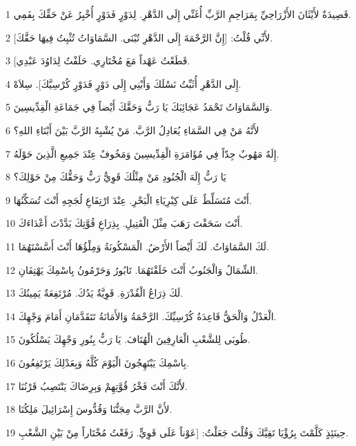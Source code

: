 \par 1 قَصِيدَةٌ لأَيْثَانَ الأَزْرَاحِيِّ بِمَرَاحِمِ الرَّبِّ أُغَنِّي إِلَى الدَّهْرِ. لِدَوْرٍ فَدَوْرٍ أُخْبِرُ عَنْ حَقِّكَ بِفَمِي.
\par 2 لأَنِّي قُلْتُ: [إِنَّ الرَّحْمَةَ إِلَى الدَّهْرِ تُبْنَى. السَّمَاوَاتُ تُثْبِتُ فِيهَا حَقَّكَ].
\par 3 [قَطَعْتُ عَهْداً مَعَ مُخْتَارِي. حَلَفْتُ لِدَاوُدَ عَبْدِي.
\par 4 إِلَى الدَّهْرِ أُثَبِّتُ نَسْلَكَ وَأَبْنِي إِلَى دَوْرٍ فَدَوْرٍ كُرْسِيَّكَ]. سِلاَهْ.
\par 5 وَالسَّمَاوَاتُ تَحْمَدُ عَجَائِبَكَ يَا رَبُّ وَحَقَّكَ أَيْضاً فِي جَمَاعَةِ الْقِدِّيسِينَ.
\par 6 لأَنَّهُ مَنْ فِي السَّمَاءِ يُعَادِلُ الرَّبَّ. مَنْ يُشْبِهُ الرَّبَّ بَيْنَ أَبْنَاءِ اللهِ؟
\par 7 إِلَهٌ مَهُوبٌ جِدّاً فِي مُؤَامَرَةِ الْقِدِّيسِينَ وَمَخُوفٌ عِنْدَ جَمِيعِ الَّذِينَ حَوْلَهُ.
\par 8 يَا رَبُّ إِلَهَ الْجُنُودِ مَنْ مِثْلُكَ قَوِيٌّ رَبٌّ وَحَقُّكَ مِنْ حَوْلِكَ؟
\par 9 أَنْتَ مُتَسَلِّطٌ عَلَى كِبْرِيَاءِ الْبَحْرِ. عِنْدَ ارْتِفَاعِ لُجَجِهِ أَنْتَ تُسَكِّنُهَا.
\par 10 أَنْتَ سَحَقْتَ رَهَبَ مِثْلَ الْقَتِيلِ. بِذِرَاعِ قُوَّتِكَ بَدَّدْتَ أَعْدَاءَكَ.
\par 11 لَكَ السَّمَاوَاتُ. لَكَ أَيْضاً الأَرْضُ. الْمَسْكُونَةُ وَمِلْؤُهَا أَنْتَ أَسَّسْتَهُمَا.
\par 12 الشِّمَالُ وَالْجَنُوبُ أَنْتَ خَلَقْتَهُمَا. تَابُورُ وَحَرْمُونُ بِاسْمِكَ يَهْتِفَانِ.
\par 13 لَكَ ذِرَاعُ الْقُدْرَةِ. قَوِيَّةٌ يَدُكَ. مُرْتَفِعَةٌ يَمِينُكَ.
\par 14 الْعَدْلُ وَالْحَقُّ قَاعِدَةُ كُرْسِيِّكَ. الرَّحْمَةُ وَالأَمَانَةُ تَتَقَدَّمَانِ أَمَامَ وَجْهِكَ.
\par 15 طُوبَى لِلشَّعْبِ الْعَارِفِينَ الْهُتَافَ. يَا رَبُّ بِنُورِ وَجْهِكَ يَسْلُكُونَ.
\par 16 بِاسْمِكَ يَبْتَهِجُونَ الْيَوْمَ كُلَّهُ وَبِعَدْلِكَ يَرْتَفِعُونَ.
\par 17 لأَنَّكَ أَنْتَ فَخْرُ قُوَّتِهِمْ وَبِرِضَاكَ يَنْتَصِبُ قَرْنُنَا.
\par 18 لأَنَّ الرَّبَّ مِجَنُّنَا وَقُدُّوسَ إِسْرَائِيلَ مَلِكُنَا.
\par 19 حِينَئِذٍ كَلَّمْتَ بِرُؤْيَا تَقِيَّكَ وَقُلْتَ جَعَلْتُ: [عَوْناً عَلَى قَوِيٍّ. رَفَعْتُ مُخْتَاراً مِنْ بَيْنِ الشَّعْبِ.

